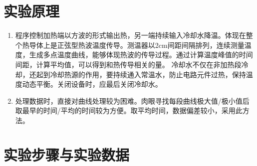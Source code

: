 \documentclass[11pt]{article}
\begin{document}
\section{实验原理}
\begin{enumerate}
    \item 程序控制加热端以方波的形式输出热，另一端持续输入冷却水降温。体现在整个热导体上是正弦型热波温度传导。测温器以2cm间距间隔排列，连续测量温度，生成多点温度曲线，能够体现热波的传导过程。通过计算温度峰值的时间间距，计算平均值，可以得到和热传导相关的量。
    \newline 冷却水不仅在非加热段冷却，还起到冷却热源的作用，要持续通入常温水，防止电路元件过热，保持温度动态平衡。关闭设备时，应最后关闭冷却水。
    \item 处理数据时，直接对曲线处理较为困难。肉眼寻找每段曲线极大值/极小值后取最早的时间/平均的时间较为方便。取平均时间，数据偏差较小，采用此方法。
\end{enumerate}

\section{实验步骤与实验数据}
\end{document}
